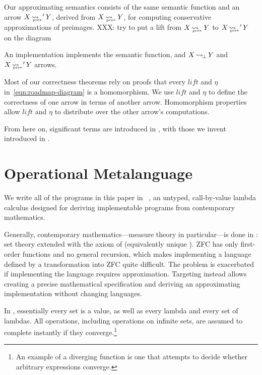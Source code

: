 \documentclass[preprint]{sigplanconf}
\newcommand{\arrow}{\rightsquigarrow}
\newcommand{\arrowlift}{\ensuremath{lift}}
\newcommand{\arrowtrans}{\ensuremath{\eta}}
\DeclareMathOperator{\botto}{\arrow_{\mspace{-3mu}\bot}}
\DeclareMathOperator{\ppreto}{\arrow_{\mspace{-19mu}_{\mathrm{pre*}}}}
\begin{document}
Our approximating semantics consists of the same semantic function and an arrow $X \ppreto' Y$, derived from $X \ppreto Y$, for computing conservative approximations of preimages. XXX: try to put a lift from $X \ppreto Y$ to $X \ppreto' Y$ on the diagram

An implementation implements the semantic function, and $X \botto Y$ and $X \ppreto' Y$ arrows.

Most of our correctness theorems rely on proofs that every $\arrowlift$ and $\arrowtrans$ in~\eqref{eqn:roadmap-diagram} is a homomorphism.
We use $\arrowlift$ and $\arrowtrans$ to define the correctness of one arrow in terms of another arrow.
Homomorphism properties allow $\arrowlift$ and $\arrowtrans$ to distribute over the other arrow's computations.

From here on, significant terms are introduced in , with those we invent introduced in .


\section{Operational Metalanguage}

We write all of the programs in this paper in \lzfclang~\cite{cit:toronto-2012flops-lzfc}, an untyped, call-by-value lambda calculus designed for deriving implementable programs from contemporary mathematics.

Generally, contemporary mathematics---measure theory in particular---is done in :  set theory extended with the axiom of  (equivalently unique ).
ZFC has only first-order functions and no general recursion, which makes implementing a language defined by a transformation into ZFC quite difficult.
The problem is exacerbated if implementing the language requires approximation.
Targeting \lzfclang instead allows creating a precise mathematical specification and deriving an approximating implementation without changing languages.

In \lzfclang, essentially every set is a value, as well as every lambda and every set of lambdas.
All operations, including operations on infinite sets, are assumed to complete instantly if they converge.\footnote{An example of a diverging \lzfclang function is one that attempts to decide whether arbitrary \lzfclang expressions converge.}
\end{document}
